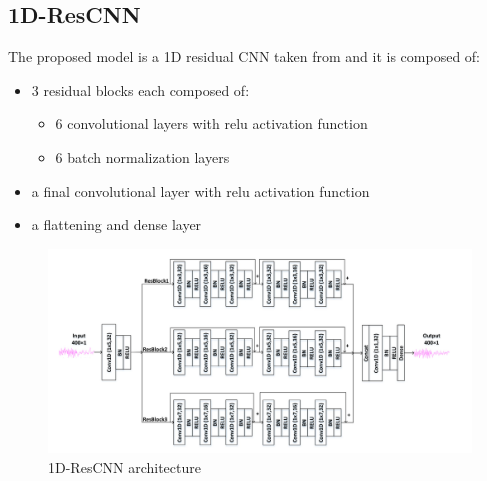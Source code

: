 \documentclass[a4paper, noexaminfo]{sapthesis}
\begin{document}
\subsection{1D-ResCNN}\label{sec:1D-ResCNN}
The proposed model is a 1D residual CNN taken from\cite{1DResCNN}
 and it is composed of:
\begin{itemize}
\item 3 residual blocks each composed of:
\begin{itemize}
\item 6 convolutional layers with relu activation function
\item 6 batch normalization layers
\end{itemize}
\item a final convolutional layer with relu activation function
\item a flattening and dense layer 
\end{itemize}
\begin{figure}[h!]
  \centering
  \includegraphics[width=1\linewidth]{model_architecture_Res_CNN.png}
  \caption{1D-ResCNN architecture}
  \end{figure}
\end{document}
